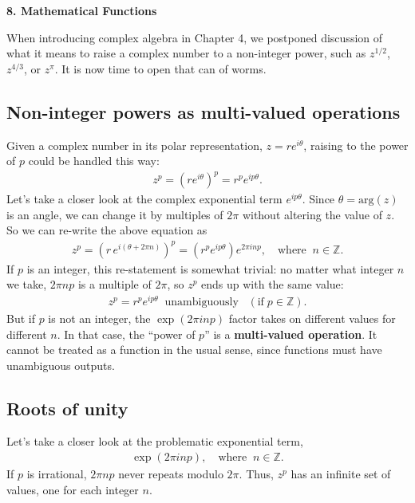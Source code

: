 \documentclass[10pt,a4paper]{article}
\begin{document}
\setcounter{page}{52}

\noindent
{\Large \textbf{8. Mathematical Functions}}
\vskip 0.2in

\label{branch-points-and-branch-cuts}

When introducing complex algebra in Chapter 4, we postponed discussion
of what it means to raise a complex number to a non-integer power,
such as $z^{1/2}$, $z^{4/3}$, or $z^{\pi}$. It is now time to open
that can of worms.

\subsection{Non-integer powers as multi-valued operations}
\label{non-integer-powers-as-multi-valued-operations}

Given a complex number in its polar representation, $z = r
e^{i\theta}$, raising to the power of $p$ could be handled this way:
\begin{align}
  z^p = \left(re^{i\theta}\right)^p = r^p e^{ip\theta}.
\end{align}
Let's take a closer look at the complex exponential term
$e^{ip\theta}$.  Since $\theta = \mathrm{arg}(z)$ is an angle, we can
change it by multiples of $2\pi$ without altering the value of $z$.
So we can re-write the above equation as
\begin{align}
  z^p = \left(r\,e^{i(\theta + 2\pi n)}\right)^p = \left(r^p e^{ip\theta} \right) e^{2\pi i n p}, \quad \mathrm{where}\;\; n\in\mathbb{Z}.
\end{align}
If $p$ is an integer, this re-statement is somewhat trivial: no matter
what integer $n$ we take, $2\pi n p$ is a multiple of $2\pi$, so $z^p$
ends up with the same value:
\begin{align}
  z^p = r^p e^{ip\theta} \;\;\textrm{unambiguously} \;\;\;(\text{if}\;p\in\mathbb{Z}).
\end{align}
But if $p$ is not an integer, the $\exp\left(2 \pi i np\right)$ factor
takes on different values for different $n$. In that case, the ``power
of $p$'' is a \textbf{multi-valued operation}. It cannot be treated as
a function in the usual sense, since functions must have unambiguous
outputs.

\subsection{Roots of unity}\label{roots-of-unity}

Let's take a closer look at the problematic exponential term,
\begin{align}
  \exp\left(2\pi i np\right), \quad\mathrm{where}\;\; n \in \mathbb{Z}.
\end{align}
If $p$ is irrational, $2\pi np$ never repeats modulo $2\pi$. Thus,
$z^p$ has an infinite set of values, one for each integer $n$.
\end{document}
